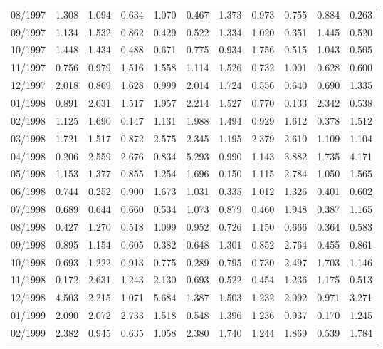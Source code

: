 \begin{tabular}{lrrrrrrrrrr}
08/1997 &  1.308 &  1.094 &  0.634 &  1.070 &  0.467 &  1.373 &  0.973 &  0.755 &  0.884 &  0.263 \\
09/1997 &  1.134 &  1.532 &  0.862 &  0.429 &  0.522 &  1.334 &  1.020 &  0.351 &  1.445 &  0.520 \\
10/1997 &  1.448 &  1.434 &  0.488 &  0.671 &  0.775 &  0.934 &  1.756 &  0.515 &  1.043 &  0.505 \\
11/1997 &  0.756 &  0.979 &  1.516 &  1.558 &  1.114 &  1.526 &  0.732 &  1.001 &  0.628 &  0.600 \\
12/1997 &  2.018 &  0.869 &  1.628 &  0.999 &  2.014 &  1.724 &  0.556 &  0.640 &  0.690 &  1.335 \\
01/1998 &  0.891 &  2.031 &  1.517 &  1.957 &  2.214 &  1.527 &  0.770 &  0.133 &  2.342 &  0.538 \\
02/1998 &  1.125 &  1.690 &  0.147 &  1.131 &  1.988 &  1.494 &  0.929 &  1.612 &  0.378 &  1.512 \\
03/1998 &  1.721 &  1.517 &  0.872 &  2.575 &  2.345 &  1.195 &  2.379 &  2.610 &  1.109 &  1.104 \\
04/1998 &  0.206 &  2.559 &  2.676 &  0.834 &  5.293 &  0.990 &  1.143 &  3.882 &  1.735 &  4.171 \\
05/1998 &  1.153 &  1.377 &  0.855 &  1.254 &  1.696 &  0.150 &  1.115 &  2.784 &  1.050 &  1.565 \\
06/1998 &  0.744 &  0.252 &  0.900 &  1.673 &  1.031 &  0.335 &  1.012 &  1.326 &  0.401 &  0.602 \\
07/1998 &  0.689 &  0.644 &  0.660 &  0.534 &  1.073 &  0.879 &  0.460 &  1.948 &  0.387 &  1.165 \\
08/1998 &  0.427 &  1.270 &  0.518 &  1.099 &  0.952 &  0.726 &  1.150 &  0.666 &  0.364 &  0.583 \\
09/1998 &  0.895 &  1.154 &  0.605 &  0.382 &  0.648 &  1.301 &  0.852 &  2.764 &  0.455 &  0.861 \\
10/1998 &  0.693 &  1.222 &  0.913 &  0.775 &  0.289 &  0.795 &  0.730 &  2.497 &  1.703 &  1.146 \\
11/1998 &  0.172 &  2.631 &  1.243 &  2.130 &  0.693 &  0.522 &  0.454 &  1.236 &  1.175 &  0.513 \\
12/1998 &  4.503 &  2.215 &  1.071 &  5.684 &  1.387 &  1.503 &  1.232 &  2.092 &  0.971 &  3.271 \\
01/1999 &  2.090 &  2.072 &  2.733 &  1.518 &  0.548 &  1.396 &  1.236 &  0.937 &  0.170 &  1.245 \\
02/1999 &  2.382 &  0.945 &  0.635 &  1.058 &  2.380 &  1.740 &  1.244 &  1.869 &  0.539 &  1.784 \\

\end{tabular}
